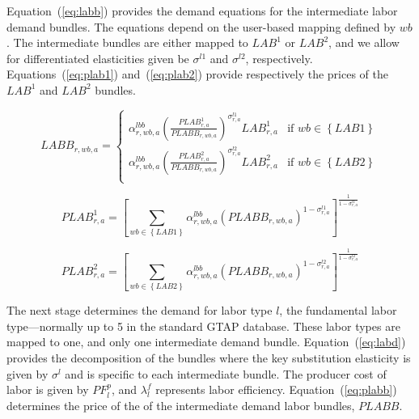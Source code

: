 \documentclass[11pt,letterpaper]{report}
\begin{document}
Equation~(\ref{eq:labb}) provides the demand equations for the intermediate
labor demand bundles. The equations depend on the user-based mapping defined
by $\mathit{wb}$. The intermediate bundles are either mapped to $\mathit{LAB^1}$ or $\mathit{LAB^2}$, and we allow for differentiated elasticities given
be $\sigma^{\mathit{l1}}$ and $\sigma^{\mathit{l2}}$, respectively.
Equations~(\ref{eq:plab1}) and~(\ref{eq:plab2}) provide respectively
the prices of the $\mathit{LAB^1}$ and $\mathit{LAB^2}$ bundles.

\begin{equation}
\label{eq:labb}
\mathit{LABB}_{r,\mathit{wb},a} =
\begin{cases}
   \displaystyle \alpha^{\mathit{lbb}}_{r,\mathit{wb},a}
      \left( \frac {\mathit{PLAB}^1_{r,a}}
         {\mathit{PLABB}_{r,\mathit{wb},a}}
      \right)^{\sigma^{\mathit{l1}}_{r,a}}
      {\mathit{LAB}^1_{r,a}}
   & \textrm{if } \mathit{wb} \in \left\{ \mathit{LAB1} \right\} \\
   \displaystyle \alpha^{\mathit{lbb}}_{r,\mathit{wb},a}
      \left( \frac {\mathit{PLAB}^2_{r,a}}
         {\mathit{PLABB}_{r,\mathit{wb},a}}
      \right)^{\sigma^{\mathit{l2}}_{r,a}}
    {\mathit{LAB}^2_{r,a}}
   & \textrm{if } \mathit{wb} \in \left\{ \mathit{LAB2} \right\} \\
\end{cases}
\end{equation}

\begin{equation}
\label{eq:plab1}
\mathit{PLAB}^1_{r,a} =
   \left[
      \sum_{\mathit{wb} \in \left\{ \mathit{LAB1} \right\}} {
         \alpha^{\mathit{lbb}}_{r,\mathit{wb},a}
         \left(  {\mathit{PLABB}_{r,\mathit{wb},a}}
         \right)^{1 - \sigma^{\mathit{l1}}_{\mathit{r,a}}}
      }
   \right]^{\frac{1} {1 - \sigma^{\mathit{l1}}_{\mathit{r,a}}}}
\end{equation}

\begin{equation}
\label{eq:plab2}
\mathit{PLAB}^2_{r,a} =
   \left[
      \sum_{\mathit{wb} \in \left\{ \mathit{LAB2} \right\}} {
         \alpha^{\mathit{lbb}}_{r,\mathit{wb},a}
         \left(  {\mathit{PLABB}_{r,\mathit{wb},a}}
         \right)^{1 - \sigma^{\mathit{l2}}_{\mathit{r,a}}}
      }
   \right]^{\frac{1} {1 - \sigma^{\mathit{l2}}_{\mathit{r,a}}}}
\end{equation}

The next stage determines the demand for labor type $l$, the fundamental labor type---normally up to 5 in the standard GTAP database. These
labor types are mapped to one, and only one intermediate demand bundle. Equation~(\ref{eq:labd}) provides the decomposition of the bundles where the key
substitution elasticity is given by $\sigma^{\mathit{l}}$ and is
specific to each intermediate bundle. The producer cost of labor is given by $\mathit{PF}^p_l$, and $\lambda^f_l$
represents labor efficiency. Equation~(\ref{eq:plabb}) determines the price of
the of the intermediate demand labor bundles, $\mathit{PLABB}$.
\end{document}
